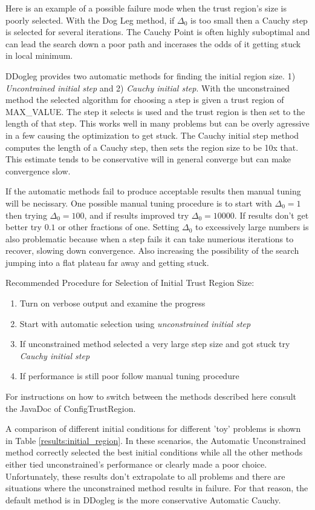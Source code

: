 \documentclass[peerreview,compsoc,onecolumn]{IEEEtran}
\newenvironment{enumargin}[1]{\begin{enumerate}[leftmargin=#1\textwidth , rightmargin=#1\textwidth]}{\end{enumerate}}
\begin{document}
Here is an example of a possible failure mode when the trust region's size is poorly selected. With the Dog Leg method, if $\Delta_0$ is too small then a Cauchy step is selected for several iterations. The Cauchy Point is often highly suboptimal and can lead the search down a poor path and incerases the odds of it getting stuck in local minimum. 

DDogleg provides two automatic methods for finding the initial region size. 1) \emph{Uncontrained initial step} and 2) \emph{Cauchy initial step}. With the unconstrained method the selected algorithm for choosing a step is given a trust region of MAX\_VALUE. The step it selects is used and the trust region is then set to the length of that step. This works well in many problems but can be overly agressive in a few causing the optimization to get stuck. The Cauchy initial step method computes the length of a Cauchy step, then sets the region size to be 10x that. This estimate tends to be conservative will in general converge but can make convergence slow.

If the automatic methods fail to produce acceptable results then manual tuning will be necissary. One possible manual tuning procedure is to start with $\Delta_0=1$ then trying $\Delta_0=100$, and if results improved try $\Delta_0=10000$. If results don't get better try $0.1$ or other fractions of one. Setting $\Delta_0$ to excessively large numbers is also problematic because when a step fails it can take numerious iterations to recover, slowing down convergence. Also increasing the possibility of the search jumping into a flat plateau far away and getting stuck. 

Recommended Procedure for Selection of Initial Trust Region Size:
\begin{enumargin}{0.2}
\item Turn on verbose output and examine the progress
\item Start with automatic selection using \emph{unconstrained initial step}
\item If unconstrained method selected a very large step size and got stuck try \emph{Cauchy initial step}
\item If performance is still poor follow manual tuning procedure
\end{enumargin}
For instructions on how to switch between the methods described here consult the JavaDoc of ConfigTrustRegion.

A comparison of different initial conditions for different 'toy' problems is shown in Table \ref{results:initial_region}. In these scenarios, the Automatic Unconstrained method correctly selected the best initial conditions while all the other methods either tied unconstrained's performance or clearly made a poor choice. Unfortunately, these results don't extrapolate to all problems and there are situations where the unconstrained method results in failure. For that reason, the default method is in DDogleg is the more conservative Automatic Cauchy.
\end{document}

